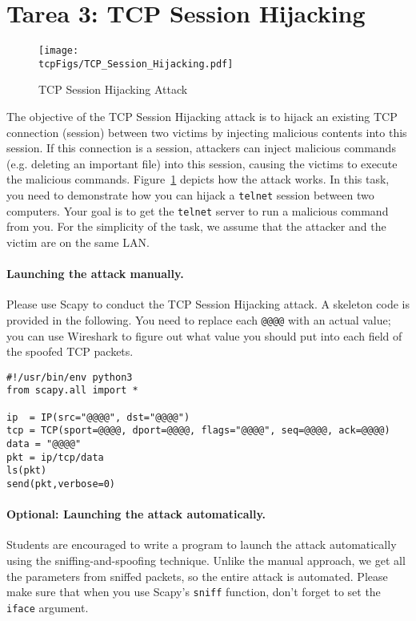             


\section{Tarea 3: TCP Session Hijacking}



\begin{figure}[htb]
  \begin{center}
    \texttt{[image: \\tcpFigs/TCP\_Session\_Hijacking.pdf]}
  \end{center}
  \caption{TCP Session Hijacking Attack}
  \label{tcp:fig:hijacking}
\end{figure}
 
   
The objective of the TCP Session Hijacking attack is to hijack an 
existing TCP connection (session) between two victims by injecting malicious contents
into this session. If this connection is a \telnet session, attackers
can inject malicious commands (e.g. deleting an important file) 
into this session, causing the victims 
to execute the malicious commands. 
Figure~\ref{tcp:fig:hijacking} depicts how the attack works.
In this task, you need to demonstrate how you can hijack a 
\texttt{telnet} session between two computers. Your goal is to get the
\texttt{telnet} server to run a malicious command from you.
For the simplicity of the task, we assume that 
the attacker and the victim are on the same LAN.


\paragraph{Launching the attack manually.}
Please use Scapy to conduct the TCP Session Hijacking attack.
A skeleton code is provided in the following. You need to replace each
\texttt{@@@@} with an actual value; you can use Wireshark to figure out what value you 
should put into each field of the spoofed TCP packets. 


\begin{lstlisting}
#!/usr/bin/env python3
from scapy.all import *

ip  = IP(src="@@@@", dst="@@@@")
tcp = TCP(sport=@@@@, dport=@@@@, flags="@@@@", seq=@@@@, ack=@@@@)
data = "@@@@"
pkt = ip/tcp/data
ls(pkt)
send(pkt,verbose=0)
\end{lstlisting}


\paragraph{Optional: Launching the attack automatically.}
Students are encouraged to write a program to launch the
attack automatically using the sniffing-and-spoofing technique.
Unlike the manual approach, we get all the parameters
from sniffed packets, so the entire attack is automated.
Please make sure that when you
use Scapy's \texttt{sniff} function, don't forget to
set the \texttt{iface} argument.





